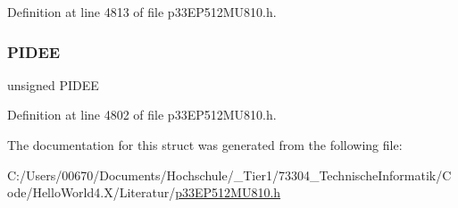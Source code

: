 Definition at line 4813 of file p33\+E\+P512\+M\+U810.\+h.

\mbox{\label{structtag_u1_e_i_e_b_i_t_s_a183ec43af8dfd0a97051d372cbe49866}} 
\subsubsection{\texorpdfstring{P\+I\+D\+EE}{PIDEE}}
{\footnotesize\ttfamily unsigned P\+I\+D\+EE}



Definition at line 4802 of file p33\+E\+P512\+M\+U810.\+h.



The documentation for this struct was generated from the following file\+:\begin{DoxyCompactItemize}
\item 
C\+:/\+Users/00670/\+Documents/\+Hochschule/\+\_\+\+Tier1/73304\+\_\+\+Technische\+Informatik/\+Code/\+Hello\+World4.\+X/\+Literatur/\hyperlink{p33_e_p512_m_u810_8h}{p33\+E\+P512\+M\+U810.\+h}\end{DoxyCompactItemize}
